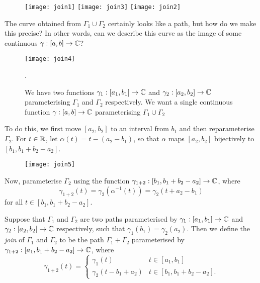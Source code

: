 \begin{figure}[h]
\centering
\begin{framed}
\texttt{[image: join1]}
\hspace{2cm}
\texttt{[image: join3]}
\vspace*{1cm}
\texttt{[image: join2]}
\end{framed}
\end{figure}

The curve obtained from $\Gamma_1 \cup \Gamma_2 $ certainly looks like a path, but how do we make this precise?  In other words, can we describe this curve as the image of some continuous $\gamma: [a,b] \to \mathbb{C}$?
\begin{figure}[h]
\centering
\texttt{[image: join4]}
\caption{We have two functions $\gamma_1:[a_1,b_1] \to \mathbb{C}$ and $\gamma_2:[a_2,b_2] \to \mathbb{C}$ parameterising $\Gamma_1$ and $\Gamma_2$ respectively.  We want a single continuous function $\gamma:[a,b] \to \mathbb{C}$ parameterising $\Gamma_1 \cup \Gamma_2$}.
\end{figure}
To do this, we first move $[a_2,b_2]$ to an interval from $b_1$ and then reparameterise $\Gamma_2$.  For $t \in \mathbb{R}$, let $\alpha(t)=  t-(a_2-b_1)$, so that $\alpha$ maps $[a_2,b_2]$ bijectively to $[b_1,b_1+b_2-a_2]$.
\begin{figure}[h]
\centering
\texttt{[image: join5]}
\end{figure}
Now, parameterise $\Gamma_2$ using the function $\gamma_{1+2}:[b_1,b_1+b_2-a_2] \to \mathbb{C}$, where
\[
\gamma_{1+2} (t) = \gamma_2 ( \alpha^{-1} (t) ) = \gamma_2 (t+a_2-b_1)
\]
for all $t \in [b_1,b_1+b_2-a_2]$.
\begin{definition}
Suppose that $\Gamma_1$ and $\Gamma_2$ are two paths parameterised by $\gamma_1:[a_1,b_1] \to \mathbb{C}$ and $\gamma_2:[a_2,b_2] \to \mathbb{C}$ respectively, such that $\gamma_1(b_1) = \gamma_2 (a_2)$.  Then we define the \emph{join} of $\Gamma_1$ and $\Gamma_2$ to be the path $\Gamma_1+\Gamma_2$ parameterised by $\gamma_{1+2}:[a_1,b_1+b_2-a_2] \to \mathbb{C}$, where
\[
\gamma_{1+2} (t) = \begin{cases}
\gamma_1 (t) & t \in [a_1,b_1] \\
\gamma_2 (t-b_1+a_2) & t \in [b_1,b_1+b_2-a_2].
\end{cases}
\]
\end{definition}


